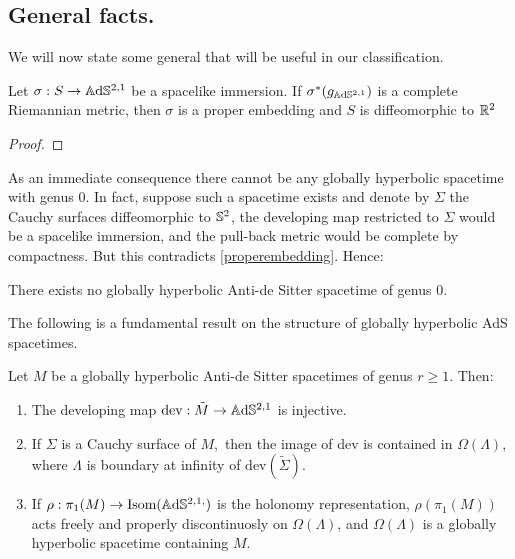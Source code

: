 \subsection{General facts.} We will now state some general that will be useful in our classification.

\begin{lemma}\label{properembedding}
    Let $\sigma:S\to\A^{2,1}$ be a spacelike immersion. If $\sigma^*(g_{\A^{2,1}})$ is a complete Riemannian metric, then $\sigma$ is a proper embedding and $S$ is diffeomorphic to $\R^2$
\end{lemma}
\begin{proof}
    
\end{proof}

As an immediate consequence there cannot be any globally hyperbolic spacetime with genus $0$. In fact, suppose such a spacetime exists and denote by $\Sigma$ the Cauchy surfaces diffeomorphic to $\S^2$, the developing map restricted to $\Sigma$ would be a spacelike immersion, and the pull-back metric would be complete by compactness. But this contradicts \ref{properembedding}. Hence: 

\begin{corollary}
    There exists no globally hyperbolic Anti-de Sitter spacetime of genus 0. 
\end{corollary}

The following is a fundamental result on the structure of globally hyperbolic AdS spacetimes.

\begin{proposition}\label{holorep}
    Let $M$ be a globally hyperbolic Anti-de Sitter spacetimes of genus $r\geq 1$. Then: 
    \begin{enumerate}
        \item The developing map $\text{dev}:\tilde{M}  \to  \A^{2,1}$ is injective. 
        \item If $\Sigma$ is a Cauchy surface of $M,$ then the image of dev is contained in $\Omega(\Lambda)$, where $\Lambda$ is boundary at infinity of $\text{dev}(\tilde{\Sigma}).$
        \item If $\rho:\pi_1(M)\to\text{Isom}(\A^{2,1,})$ is the holonomy representation, $\rho(\pi_1(M))$ acts freely and properly discontinuosly on $\Omega(\Lambda)$, and $\Omega(\Lambda)$ is a globally hyperbolic spacetime containing $M$. 
    \end{enumerate}
\end{proposition}

